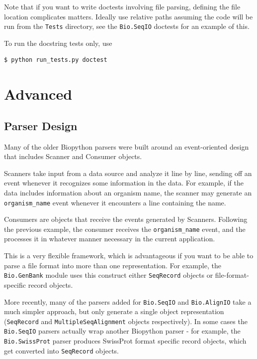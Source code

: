 \documentclass{report}
\begin{document}
Note that if you want to write doctests involving file parsing, defining
the file location complicates matters.  Ideally use relative paths assuming
the code will be run from the \verb|Tests| directory, see the
\verb|Bio.SeqIO| doctests for an example of this.

To run the docstring tests only, use
\begin{verbatim}
$ python run_tests.py doctest
\end{verbatim}

\chapter{Advanced}
\label{chapter:advanced}

\section{Parser Design}

Many of the older Biopython parsers were built around an event-oriented
design that includes Scanner and Consumer objects.

Scanners take input from a data source and analyze it line by line,
sending off an event whenever it recognizes some information in the
data.  For example, if the data includes information about an organism
name, the scanner may generate an \verb|organism_name| event whenever it
encounters a line containing the name.

Consumers are objects that receive the events generated by Scanners.
Following the previous example, the consumer receives the
\verb|organism_name| event, and the processes it in whatever manner
necessary in the current application.

This is a very flexible framework, which is advantageous if you want to
be able to parse a file format into more than one representation.  For
example, the \verb|Bio.GenBank| module uses this construct either
\verb|SeqRecord| objects or file-format-specific record objects.

More recently, many of the parsers added for \verb|Bio.SeqIO| and
\verb|Bio.AlignIO| take a much simpler approach, but only generate a
single object representation (\verb|SeqRecord| and
\verb|MultipleSeqAlignment| objects respectively). In some cases the
\verb|Bio.SeqIO| parsers actually wrap
another Biopython parser - for example, the \verb|Bio.SwissProt| parser
produces SwissProt format specific record objects, which get converted
into \verb|SeqRecord| objects.
\end{document}
